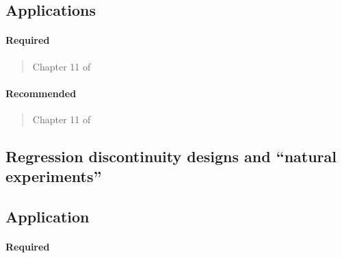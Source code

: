 \documentclass[12pt]{article}
\begin{document}
\subsection*{Applications}

\begin{verse}  \end{verse}

\begin{verse}  \end{verse}

\paragraph*{Required}

\begin{verse} Chapter 11 of  \end{verse}

\paragraph*{Recommended}

\begin{verse}  \end{verse}

\begin{verse} Chapter 11 of  \end{verse}

\begin{verse}  \end{verse}

\begin{verse}  \end{verse}

\subsection{Regression discontinuity designs and ``natural experiments''}

\subsection*{Application}

\begin{verse}  \end{verse}

\paragraph*{Required}
\end{document}

